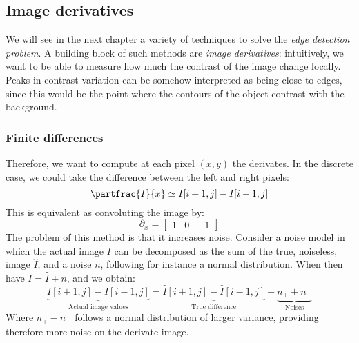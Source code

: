 
\subsection{Image derivatives}
We will see in the next chapter a variety of techniques to solve the \emph{edge detection problem}. A building block of such methods are \emph{image derivatives}: intuitively, we want to be able to measure how much the contrast of the image change locally. Peaks in contrast variation can be somehow interpreted as being close to edges, since this would be the point where the contours of the object contrast with the background.
\subsubsection{Finite differences}

Therefore, we want to compute at each pixel $(x, y)$ the derivates. In the discrete case, we could take the difference between the left and right pixels:
\begin{equation*}
    \partfrac{I}{x} \simeq I[i+1, j] - I[i-1,j]
\end{equation*}
This is equivalent as convoluting the image by:
\begin{equation*}
    \partial_x = \begin{bmatrix}
        1&0&-1
    \end{bmatrix}
\end{equation*}
The problem of this method is that it increases noise. Consider a noise model in which the actual image $I$ can be decomposed as the sum of the true, noiseless, image $\hat{I}$, and a noise $n$, following for instance a normal distribution. When then have $I=\hat{I}+n$, and we obtain:
\begin{equation*}
    \underbrace{I[i+1,j]-I[i-1,j]}_{\text{Actual image values}}=\underbrace{\hat{I}[i+1,j]-\hat{I}[i-1,j]}_{\text{True difference}}+\underbrace{n_++n_-}_{\text{Noises}}
\end{equation*}
Where $n_+-n_-$ follows a normal distribution of larger variance, providing therefore more noise on the derivate image.

